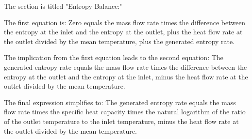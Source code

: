 The section is titled "Entropy Balance:"

The first equation is:
Zero equals the mass flow rate times the difference between the entropy at the inlet and the entropy at the outlet, plus the heat flow rate at the outlet divided by the mean temperature, plus the generated entropy rate.

The implication from the first equation leads to the second equation:
The generated entropy rate equals the mass flow rate times the difference between the entropy at the outlet and the entropy at the inlet, minus the heat flow rate at the outlet divided by the mean temperature.

The final expression simplifies to:
The generated entropy rate equals the mass flow rate times the specific heat capacity times the natural logarithm of the ratio of the outlet temperature to the inlet temperature, minus the heat flow rate at the outlet divided by the mean temperature.